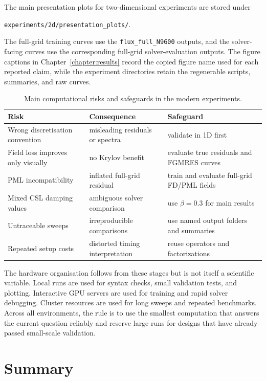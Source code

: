 The main presentation plots for two-dimensional experiments are stored under
\begin{center}
\texttt{experiments/2d/presentation\_plots/}.
\end{center}
The full-grid training curves use the \texttt{flux\_full\_N9600} outputs, and
the solver-facing curves use the corresponding full-grid solver-evaluation
outputs.
The figure captions in Chapter~\ref{chapter:results} record the copied figure
name used for each reported claim, while the experiment directories retain the
regenerable scripts, summaries, and raw curves.

\begin{table}[htbp]
\centering
\caption{Main computational risks and safeguards in the modern experiments.}
\label{tab:setup-computational-safeguards}
\begin{tabular}{lll}
\toprule
Risk & Consequence & Safeguard \\
\midrule
Wrong discretisation convention & misleading residuals or spectra &
validate in 1D first \\
Field loss improves only visually & no Krylov benefit &
evaluate true residuals and FGMRES curves \\
PML incompatibility & inflated full-grid residual &
train and evaluate full-grid FD/PML fields \\
Mixed CSL damping values & ambiguous solver comparison &
use $\beta=0.3$ for main results \\
Untraceable sweeps & irreproducible comparisons &
use named output folders and summaries \\
Repeated setup costs & distorted timing interpretation &
reuse operators and factorizations \\
\bottomrule
\end{tabular}
\end{table}

The hardware organisation follows from these stages but is not itself a
scientific variable. Local runs are used for syntax checks, small validation
tests, and plotting. Interactive GPU servers are used for training and rapid
solver debugging. Cluster resources are used for long sweeps and repeated
benchmarks. Across all environments, the rule is to use the smallest
computation that answers the current question reliably and reserve large runs
for designs that have already passed small-scale validation.

\section{Summary}
\label{sec:setup-summary}

